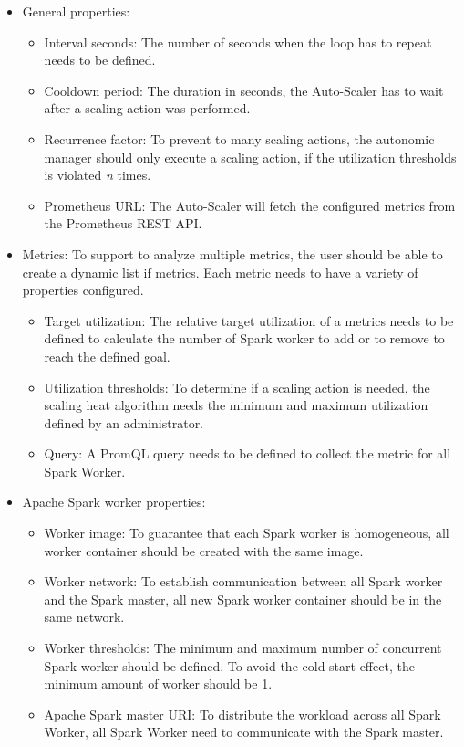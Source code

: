\begin{itemize}
\item General properties:
\begin{itemize}
\item Interval seconds: The number of seconds when the loop has to repeat needs to be defined.

\item Cooldown period: The duration in seconds,  the Auto-Scaler has to wait after a scaling action was performed.

\item Recurrence factor: To prevent to many scaling actions,  the autonomic manager should only execute a scaling action,  if the utilization thresholds is violated \textit{n} times.

\item Prometheus URL: The Auto-Scaler will fetch the configured metrics from the Prometheus REST API.
\end{itemize}

\item Metrics:
To support to analyze multiple metrics, the user should be able to create a dynamic list if metrics. Each metric needs to have a variety of properties configured.
\begin{itemize}
\item Target utilization: The relative target utilization of a metrics needs to be defined to calculate the number of Spark worker to add or to remove to reach the defined goal.

\item Utilization thresholds: To determine if a scaling action is needed, the scaling heat algorithm needs the minimum and maximum utilization defined by an administrator.

\item Query: A PromQL query needs to be defined to collect the metric for all Spark Worker.
\end{itemize}

\item Apache Spark worker properties:
\begin{itemize}
\item Worker image: To guarantee that each Spark worker is homogeneous, all worker container should be created with the same image.

\item Worker network: To establish communication between all Spark worker and the Spark master, all new Spark worker container should be in the same network.

\item Worker thresholds: The minimum and maximum number of concurrent Spark worker should be defined. To avoid the cold start effect, the minimum amount of worker should be 1. 

\item Apache Spark master URI: To distribute the workload across all Spark Worker, all Spark Worker need to communicate with the Spark master.
\end{itemize}
\end{itemize}


